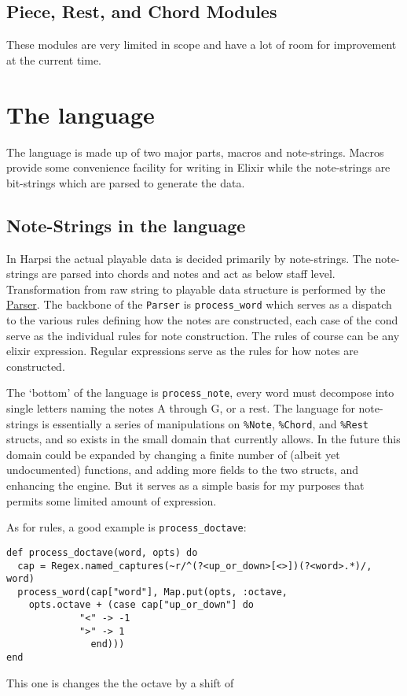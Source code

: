 \documentclass[11pt]{article}
\begin{document}
\subsection{Piece, Rest, and Chord Modules}
\label{sec-1-3}
These modules are very limited in scope and have a lot of room for
improvement at the current time.

\section{The language}
\label{sec-2}
The language is made up of two major parts, macros and
note-strings. Macros provide some convenience facility for writing
in Elixir while the note-strings are bit-strings which are parsed to
generate the data.

\subsection{Note-Strings in the language}
\label{sec-2-1}
In Harpsi the actual playable data is decided primarily by
note-strings. The note-strings are parsed into chords and notes and
act as below staff level. Transformation from raw string to
playable data structure is performed by the \href{lib/parser.ex}{Parser}. The
backbone of the \verb~Parser~ is \verb~process_word~ which serves as a
dispatch to the various rules defining how the notes are
constructed, each case of the cond serve as the individual rules
for note construction. The rules of course can be any elixir
expression. Regular expressions serve as the rules for how notes
are constructed. 

The `bottom' of the language is \verb~process_note~, every word must
decompose into single letters naming the notes A through G, or a
rest. The language for note-strings is essentially a series of
manipulations on \verb~%Note~, \verb~%Chord~, and \verb~%Rest~ structs, and so exists in the
small domain that currently allows. In the future this domain could
be expanded by changing a finite number of (albeit yet
undocumented) functions, and adding more fields to the two structs,
and enhancing the engine. But it serves as a simple basis for my
purposes that permits some limited amount of expression.

As for rules, a good example is \verb~process_doctave~:
\begin{verbatim}
def process_doctave(word, opts) do
  cap = Regex.named_captures(~r/^(?<up_or_down>[<>])(?<word>.*)/, word)
  process_word(cap["word"], Map.put(opts, :octave,
	opts.octave + (case cap["up_or_down"] do
			 "<" -> -1
			 ">" -> 1
		       end)))
end
\end{verbatim}
This one is changes the the octave by a shift of 
\end{document}

